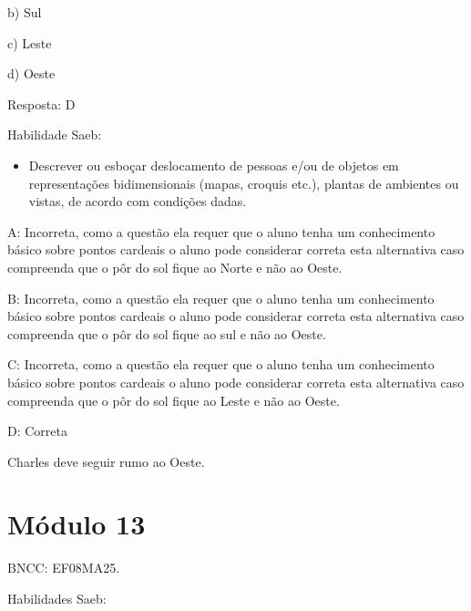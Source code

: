 b) Sul

c) Leste

d) Oeste

Resposta: D

Habilidade Saeb:

\begin{itemize}
\tightlist
\item
  Descrever ou esboçar deslocamento de pessoas e/ou de objetos em
  representações bidimensionais (mapas, croquis etc.), plantas de
  ambientes ou vistas, de acordo com condições dadas.
\end{itemize}

A: Incorreta, como a questão ela requer que o aluno tenha um
conhecimento básico sobre pontos cardeais o aluno pode considerar
correta esta alternativa caso compreenda que o pôr do sol fique ao Norte
e não ao Oeste.

B: Incorreta, como a questão ela requer que o aluno tenha um
conhecimento básico sobre pontos cardeais o aluno pode considerar
correta esta alternativa caso compreenda que o pôr do sol fique ao sul e
não ao Oeste.

C: Incorreta, como a questão ela requer que o aluno tenha um
conhecimento básico sobre pontos cardeais o aluno pode considerar
correta esta alternativa caso compreenda que o pôr do sol fique ao Leste
e não ao Oeste.

D: Correta

Charles deve seguir rumo ao Oeste.

\section{Módulo 13}

BNCC: EF08MA25.

Habilidades Saeb:

